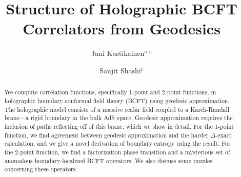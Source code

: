 \documentclass[reprint,amsmath,amssymb,aps,nofootinbib,twocolumn]{revtex4-2}
\begin{document}
\title{Structure of Holographic BCFT Correlators from Geodesics}
\author{Jani Kastikainen$^{a,b}$}
\author{Sanjit Shashi$^{c}$}


\preprint{\today}
\begin{abstract}
\noindent We compute correlation functions, specifically 1-point and 2-point functions, in holographic boundary conformal field theory (BCFT) using geodesic approximation. The holographic model consists of a massive scalar field coupled to a Karch-Randall brane---a rigid boundary in the bulk AdS space. Geodesic approximation requires the inclusion of paths reflecting off of this brane, which we show in detail. For the 1-point function, we find agreement between geodesic approximation and the harder $\Delta$-exact calculation, and we give a novel derivation of boundary entropy using the result. For the 2-point function, we find a factorization phase transition and a mysterious set of anomalous boundary-localized BCFT operators. We also discuss some puzzles concerning these operators.
 







\end{abstract}
\end{document}
